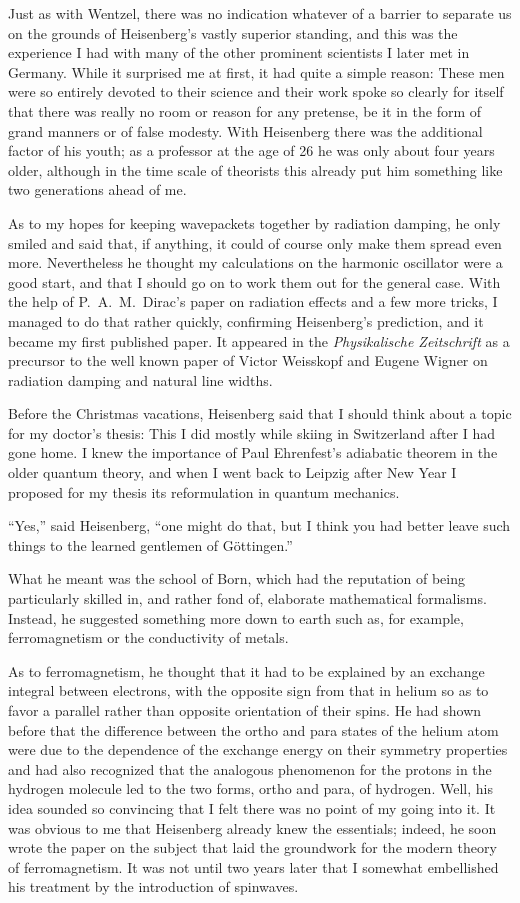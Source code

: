 \documentclass[12pt]{article}
\begin{document}
Just as with Wentzel, there was no indication whatever of a barrier to separate us on the grounds of Heisenberg's vastly superior standing, and this was the experience I had with many of the other prominent scientists I later met in Germany. While it surprised me at first, it had quite a simple reason: These men were so entirely devoted to their science and their work spoke so clearly for itself that there was really no room or reason for any pretense, be it in the form of grand manners or of false modesty. With Heisenberg there was the additional factor of his youth; as a professor at the age of 26 he was only about four years older,
although in the time scale of theorists this already put him something like two generations ahead of me.

As to my hopes for keeping wavepackets together by radiation damping, he only smiled and said that, if anything, it could of course only make them spread even more. Nevertheless he thought my calculations on the harmonic oscillator were a good start, and that I should go on to work them out for the general case. With the help of P.~A.~M.~Dirac's paper on radiation effects and a few more tricks, I managed to do that rather quickly, confirming Heisenberg's prediction, and it became my first published paper. It appeared in the {\it Physikalische Zeitschrift} as a precursor to the well known paper of Victor Weisskopf and Eugene Wigner on radiation damping and natural line widths.

Before the Christmas vacations, Heisenberg said that I should think about a topic for my doctor's thesis: This I did mostly while skiing in Switzerland after I had gone home. I knew the importance of Paul Ehrenfest's adiabatic theorem in the older quantum theory, and when I went back to Leipzig after New Year I proposed for my thesis its reformulation in quantum mechanics.

``Yes,'' said Heisenberg, ``one might do that, but I think you had better leave such things to the learned gentlemen of G\"ottingen.''

What he meant was the school of Born, which had the reputation of being particularly skilled in, and rather fond of, elaborate mathematical formalisms. Instead, he suggested something more
down to earth such as, for example, ferromagnetism or the conductivity of metals.

As to ferromagnetism, he thought that it had to be explained by an exchange integral between electrons, with the opposite sign from that in helium so as to favor a parallel rather than opposite orientation of their spins. He had shown before that the difference between the ortho and para states of the helium atom were due to the dependence of the exchange energy on their symmetry properties and had also recognized that the analogous phenomenon for the protons in the hydrogen molecule led to the two forms, ortho and para, of hydrogen. Well, his idea sounded so convincing that I felt there was no point of my going into it. It was obvious to me that Heisenberg already knew the essentials; indeed, he soon wrote the paper on the subject that laid the groundwork for the modern theory of ferromagnetism. It was not until two years later that I somewhat embellished his treatment by the introduction of spinwaves.
\end{document}
